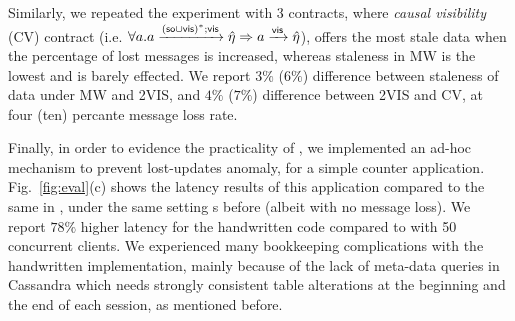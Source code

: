 Similarly, we repeated the experiment with 3 \UB{} contracts, where
\emph{causal visibility} (CV) contract (i.e. {\footnotesize $ \forall a.
a\xrightarrow{({\textsf{so}}\cup{\normalfont \textsf{vis}})^*;{\normalfont \textsf{vis}}}\hat{\eta}\Rightarrow a\xrightarrow{{\normalfont \textsf{vis}}}
\hat{\eta} $}), offers the most stale data when the percentage of lost
messages is increased, whereas staleness in MW is the lowest and is
barely effected. We report $3\%$ ($6\%$) difference 
between staleness of data under MW and 2VIS, and $4\%$ ($7\%$)
difference between 2VIS and CV,
at four (ten) percante message
loss rate.



Finally, in order to evidence the practicality of \tool, we implemented
an ad-hoc mechanism to prevent lost-updates anomaly, for a simple
counter application. Fig.~\ref{fig:eval}(c) shows the latency results of
this application compared to the same in \tool, under the same
setting s before (albeit with no message loss). We report $78\%$
higher latency for the handwritten code compared to \tool with 50
concurrent clients.
We experienced many bookkeeping complications with the handwritten
implementation, mainly because of the lack of meta-data queries in
Cassandra which needs strongly consistent table alterations at the
beginning and the end of each session, as mentioned before.










































